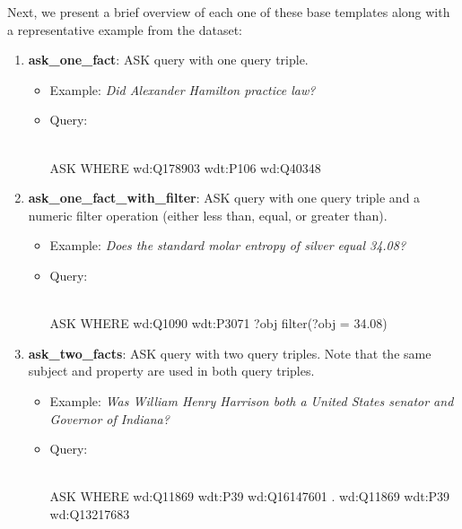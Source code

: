 Next, we present a brief overview of each one of these base templates along with a representative 
example from the dataset:

\begin{enumerate}
    \item \textbf{ask\_one\_fact}: ASK query with one query triple.
    \begin{itemize}
        \item Example: \textit{Did Alexander Hamilton practice law?}
        \item Query:\\
        \mbox{}\\
        \begin{sparqlcode}[]
ASK WHERE { 
    wd:Q178903 wdt:P106 wd:Q40348 
}
        \end{sparqlcode}
    \end{itemize}

    \item \textbf{ask\_one\_fact\_with\_filter}: ASK query with one query triple and a numeric filter 
    operation (either less than, equal, or greater than).
    \begin{itemize}
        \item Example: \textit{Does the standard molar entropy of silver equal 34.08?}
        \item Query:\\
        \mbox{}\\
        \begin{sparqlcode}[]
ASK WHERE { 
    wd:Q1090 wdt:P3071 ?obj filter(?obj = 34.08) 
}
        \end{sparqlcode}
    \end{itemize}

    \item \textbf{ask\_two\_facts}: ASK query with two query triples. Note that the same subject 
    and property are used in both query triples.
    \begin{itemize}
        \item Example: \textit{Was William Henry Harrison both a United States senator and Governor of 
        Indiana?}
        \item Query:\\
        \mbox{}\\
        \begin{sparqlcode}[]
ASK WHERE { 
    wd:Q11869 wdt:P39 wd:Q16147601 . 
    wd:Q11869 wdt:P39 wd:Q13217683 
}
        \end{sparqlcode}
    \end{itemize}


\end{enumerate}
